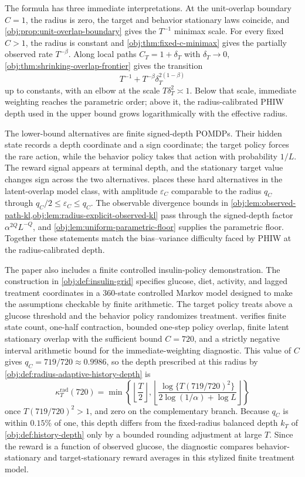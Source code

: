 The formula has three immediate interpretations. At the unit-overlap boundary \(C=1\), the radius is zero, the target and behavior stationary laws coincide, and \cref{obj:prop:unit-overlap-boundary} gives the \(T^{-1}\) minimax scale. For every fixed \(C>1\), the radius is constant and \cref{obj:thm:fixed-c-minimax} gives the partially observed rate \(T^{-\beta}\). Along local paths \(C_T=1+\delta_T\) with \(\delta_T\to0\), \cref{obj:thm:shrinking-overlap-frontier} gives the transition
\[
T^{-1}+T^{-\beta}\delta_T^{2(1-\beta)}
\]
up to constants, with an elbow at the scale \(T\delta_T^2\asymp 1\). Below that scale, immediate weighting reaches the parametric order; above it, the radius-calibrated PHIW depth used in the upper bound grows logarithmically with the effective radius.

The lower-bound alternatives are finite signed-depth POMDPs. Their hidden state records a depth coordinate and a sign coordinate; the target policy forces the rare action, while the behavior policy takes that action with probability \(1/L\). The reward signal appears at terminal depth, and the stationary target value changes sign across the two alternatives.  places these hard alternatives in the latent-overlap model class, with amplitude \(\varepsilon_C\) comparable to the radius \(q_C\) through \(q_C/2\le\varepsilon_C\le q_C\). The observable divergence bounds in \cref{obj:lem:observed-path-kl,obj:lem:radius-explicit-observed-kl} pass through the signed-depth factor \(\alpha^{2Q}L^{-Q}\), and \cref{obj:lem:uniform-parametric-floor} supplies the parametric floor. Together these statements match the bias--variance difficulty faced by PHIW at the radius-calibrated depth.

The paper also includes a finite controlled insulin-policy demonstration. The construction in \cref{obj:def:insulin-grid} specifies glucose, diet, activity, and lagged treatment coordinates in a 360-state controlled Markov model designed to make the assumptions checkable by finite arithmetic. The target policy treats above a glucose threshold and the behavior policy randomizes treatment.  verifies finite state count, one-half contraction, bounded one-step policy overlap, finite latent stationary overlap with the sufficient bound \(C=720\), and a strictly negative interval arithmetic bound for the immediate-weighting diagnostic. This value of \(C\) gives \(q_C=719/720\approx0.9986\), so the depth prescribed at this radius by \cref{obj:def:radius-adaptive-history-depth} is
\[
\kappa_T^{\mathrm{rad}}(720)
=
\min\left\{
\left\lfloor\frac{T}{2}\right\rfloor,
\left\lfloor\frac{\log\{T(719/720)^2\}}{2\log(1/\alpha)+\log L}\right\rfloor
\right\}
\]
once \(T(719/720)^2>1\), and zero on the complementary branch. Because \(q_C\) is within \(0.15\%\) of one, this depth differs from the fixed-radius balanced depth \(k_T\) of \cref{obj:def:history-depth} only by a bounded rounding adjustment at large \(T\). Since the reward is a function of observed glucose, the diagnostic compares behavior-stationary and target-stationary reward averages in this stylized finite treatment model.


